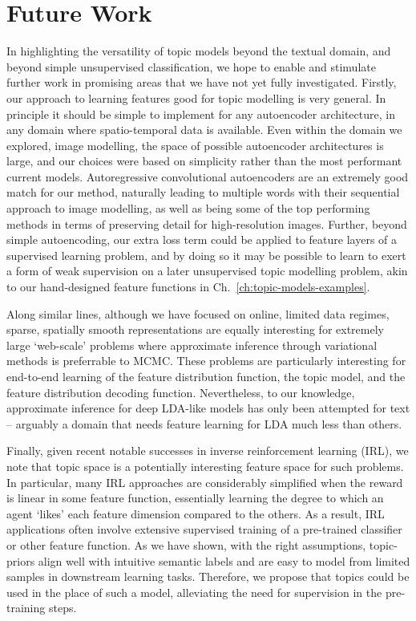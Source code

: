 \section{Future Work}
In highlighting the versatility of topic models beyond the textual domain, and beyond simple unsupervised classification, we hope to enable and stimulate further work in promising areas that we have not yet fully investigated. Firstly, our approach to learning features good for topic modelling is very general. In principle it should be simple to implement for any autoencoder architecture, in any domain where spatio-temporal data is available. Even within the domain we explored, image modelling, the space of possible autoencoder architectures is large, and our choices were based on simplicity rather than the most performant current models. Autoregressive convolutional autoencoders are an extremely good match for our method, naturally leading to multiple words with their sequential approach to image modelling, as well as being some of the top performing methods in terms of preserving detail for high-resolution images. Further, beyond simple autoencoding, our extra loss term could be applied to feature layers of a supervised learning problem, and by doing so it may be possible to learn to exert a form of weak supervision on a later unsupervised topic modelling problem, akin to our hand-designed feature functions in Ch.~\ref{ch:topic-models-examples}.

Along similar lines, although we have focused on online, limited data regimes, sparse, spatially smooth representations are equally interesting for extremely large `web-scale' problems where approximate inference through variational methods is preferrable to MCMC. These problems are particularly interesting for end-to-end learning of the feature distribution function, the topic model, and the feature distribution decoding function. Nevertheless, to our knowledge, approximate inference for deep LDA-like models has only been attempted for text -- arguably a domain that needs feature learning for LDA much less than others.

Finally, given recent notable successes in inverse reinforcement learning (IRL), we note that topic space is a potentially interesting feature space for such problems. In particular, many IRL approaches are considerably simplified when the reward is linear in some feature function, essentially learning the degree to which an agent `likes' each feature dimension compared to the others. As a result, IRL applications often involve extensive supervised training of a pre-trained classifier or other feature function. As we have shown, with the right assumptions, topic-priors align well with intuitive semantic labels and are easy to model from limited samples in downstream learning tasks. Therefore, we propose that topics could be used in the place of such a model, alleviating the need for supervision in the pre-training steps.

